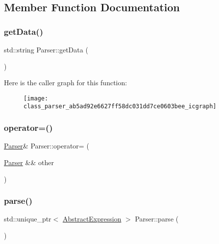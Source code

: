 \subsection{Member Function Documentation}
\mbox{\label{class_parser_ab5ad92e6627ff58dc031dd7ce0603bee}} 
\subsubsection{\texorpdfstring{getData()}{getData()}}
{\footnotesize\ttfamily std\+::string Parser\+::get\+Data (\begin{DoxyParamCaption}{ }\end{DoxyParamCaption})}

Here is the caller graph for this function\+:
\nopagebreak
\begin{figure}[H]
\begin{center}
\leavevmode
\texttt{[image: class\_parser\_ab5ad92e6627ff58dc031dd7ce0603bee\_icgraph]}
\end{center}
\end{figure}
\mbox{\label{class_parser_a32a46aa1930b03db3f9386e7cd823eeb}} 
\subsubsection{\texorpdfstring{operator=()}{operator=()}}
{\footnotesize\ttfamily \mbox{\hyperlink{class_parser}{Parser}}\& Parser\+::operator= (\begin{DoxyParamCaption}\item[{\mbox{\hyperlink{class_parser}{Parser}} \&\&}]{other }\end{DoxyParamCaption})\hspace{0.3cm}{\ttfamily [default]}}

\mbox{\label{class_parser_a1f546b5f1882a1a6bdd056ebfe606799}} 
\subsubsection{\texorpdfstring{parse()}{parse()}}
{\footnotesize\ttfamily std\+::unique\+\_\+ptr$<$ \mbox{\hyperlink{class_abstract_expression}{Abstract\+Expression}} $>$ Parser\+::parse (\begin{DoxyParamCaption}{ }\end{DoxyParamCaption})}

